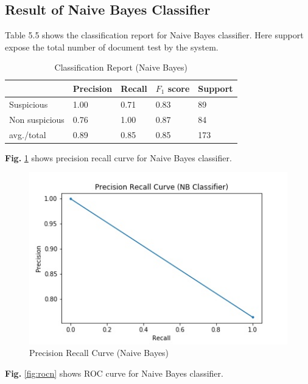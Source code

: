 \documentclass[12pt,a4paper]{report}
\begin{document}
\subsection{Result of Naive Bayes Classifier}
Table 5.5 shows the classification report for Naive Bayes classifier. Here support expose the total number of document test by the system.

\begin{table}[h!]
\begin{center}
\caption{Classification Report (Naive Bayes)}
\begin{tabular}{|m{4.4cm} | m{2cm}| m{2cm}| m{2cm}| m{2cm}|}
\hline
     & Precision & Recall & $F_1$ score & Support \\
\hline
     Suspicious & 1.00 & 0.71 & 0.83 & 89\\
\hline 
     Non suspicious  & 0.76 & 1.00 & 0.87 & 84\\
\hline 
     avg./total & 0.89 & 0.85 & 0.85 & 173\\
\hline
\end{tabular}
\end{center}
\end{table}

\noindent
\textbf{Fig.} \ref{fig:prn} shows precision recall curve for Naive Bayes classifier.

\begin{figure}[h!]
    \centering
    \includegraphics[scale=0.58]{Figures/PRN.jpg}
    \caption{Precision Recall Curve (Naive Bayes)}
    \label{fig:prn}
\end{figure}

\noindent
\textbf{Fig.} \ref{fig:rocn} shows ROC curve for Naive Bayes classifier.
\end{document}
